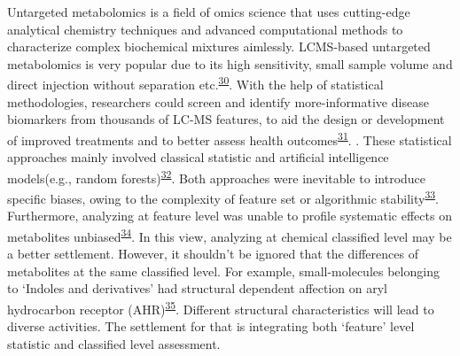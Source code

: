 \documentclass[
]{article}
\begin{document}
Untargeted metabolomics is a field of omics science that uses
cutting-edge analytical chemistry techniques and advanced computational
methods to characterize complex biochemical mixtures aimlessly.
LC­MS-based untargeted metabolomics is very popular due to its high
sensitivity, small sample volume and direct injection without separation
etc.\textsuperscript{\protect\hyperlink{ref-2016aq}{30}}. With the help
of statistical methodologies, researchers could screen and identify
more-informative disease biomarkers from thousands of LC-MS features, to
aid the design or development of improved treatments and to better
assess health
outcomes\textsuperscript{\protect\hyperlink{ref-2016ar}{31}}. . These
statistical approaches mainly involved classical statistic and
artificial intelligence models(e.g., random
forests)\textsuperscript{\protect\hyperlink{ref-2019bv}{32}}. Both
approaches were inevitable to introduce specific biases, owing to the
complexity of feature set or algorithmic
stability\textsuperscript{\protect\hyperlink{ref-2017i}{33}}.
Furthermore, analyzing at feature level was unable to profile systematic
effects on metabolites
unbiased\textsuperscript{\protect\hyperlink{ref-duhrkop_systematic_2021}{34}}.
In this view, analyzing at chemical classified level may be a better
settlement. However, it shouldn't be ignored that the differences of
metabolites at the same classified level. For example, small-molecules
belonging to `Indoles and derivatives' had structural dependent
affection on aryl hydrocarbon receptor
(AHR)\textsuperscript{\protect\hyperlink{ref-2019c}{35}}. Different
structural characteristics will lead to diverse activities. The
settlement for that is integrating both `feature' level statistic and
classified level assessment.
\end{document}
